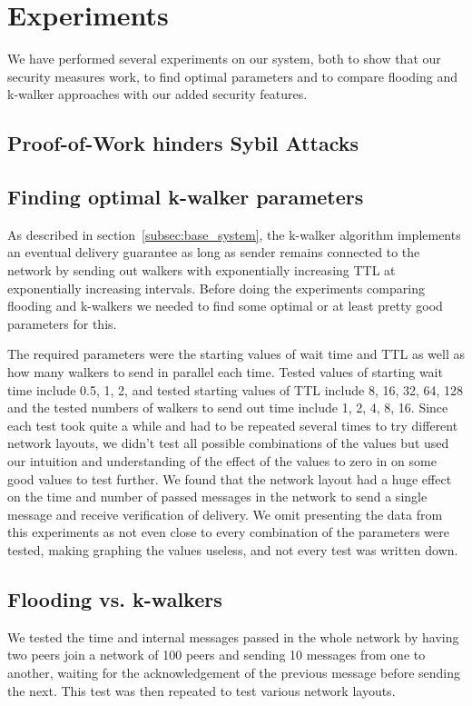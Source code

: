 \section{Experiments}
We have performed several experiments on our system, both to show that our security measures work, to find optimal parameters and to compare flooding and k-walker approaches with our added security features.

\subsection{Proof-of-Work hinders Sybil Attacks}

\subsection{Finding optimal k-walker parameters}
As described in section~\ref{subsec:base_system}, the k-walker algorithm implements an eventual delivery guarantee as long as sender remains connected to the network by sending out walkers with exponentially increasing TTL at exponentially increasing intervals. Before doing the experiments comparing flooding and k-walkers we needed to find some optimal or at least pretty good parameters for this.

The required parameters were the starting values of wait time and TTL as well as how many walkers to send in parallel each time. Tested values of starting wait time include 0.5, 1, 2, and tested starting values of TTL include 8, 16, 32, 64, 128 and the tested numbers of walkers to send out time include 1, 2, 4, 8, 16. Since each test took quite a while and had to be repeated several times to try different network layouts, we didn't test all possible combinations of the values but used our intuition and understanding of the effect of the values to zero in on some good values to test further. We found that the network layout had a huge effect on the time and number of passed messages in the network to send a single message and receive verification of delivery. We omit presenting the data from this experiments as not even close to every combination of the parameters were tested, making graphing the values useless, and not every test was written down.


\subsection{Flooding vs. k-walkers}
We tested the time and internal messages passed in the whole network by having two peers join a network of 100 peers and sending 10 messages from one to another, waiting for the acknowledgement of the previous message before sending the next. This test was then repeated to test various network layouts.

